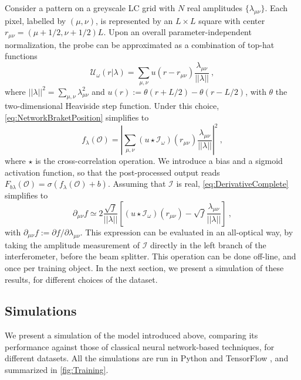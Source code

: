 \documentclass[reprint,
superscriptaddress,
nofootinbib,
aps,
pra,
showkeys
]{revtex4-2}
\newcommand{\I}{\mathcal{I}}
\newcommand{\U}{\mathcal{U}}
\newcommand{\f}{f}
\newcommand{\F}{F}
\renewcommand{\O}{\mathcal{O}}
\begin{document}
Consider a pattern on a greyscale LC grid with $N$ real amplitudes $\{\lambda_{\mu \nu}\}$. Each pixel, labelled by $(\mu,\nu)$, is represented by an $L \times L$ square with center $r_{\mu \nu} = (\mu + 1/2, \nu + 1/2)L$. Upon an overall parameter-independent normalization, the probe can be approximated as a combination of top-hat functions
\begin{equation}
	\U_{\omega}(r|\lambda) = \sum_{\mu,\nu} u(r-r_{\mu \nu})\frac{\lambda_{\mu \nu}}{||\lambda||} \ ,
	\label{eq:LCD}
\end{equation}
where $ ||\lambda||^2 = \sum_{\mu,\nu}\lambda_{\mu\nu}^2$ and $u(r) := \theta(r + L/2)-\theta(r - L/2)$, with $\theta$ the two-dimensional Heaviside step function. Under this choice, \cref{eq:NetworkBraketPosition} simplifies to
\begin{equation}
	\f_\lambda(\O) = \left| \sum_{\mu,\nu} (u \star  \I_{\omega})(r_{\mu\nu}) \frac{\lambda_{\mu \nu}}{||\lambda||} \right|^2 \ ,
	\label{eq:LCDLayerSpatial}
\end{equation}
where $\star$ is the cross-correlation operation. We introduce a bias and a sigmoid activation function, so that the post-processed output reads $\F_{b\lambda}(\O) = \sigma(\f_{\lambda}(\O) + b)$. Assuming that $\I$ is real, \cref{eq:DerivativeComplete} simplifies to
\begin{equation}
	\partial_{\mu \nu} \f \simeq 2 \frac{\sqrt{f}}{||\lambda||}\left[(u \star  \I_{\omega})(r_{\mu\nu}) - \sqrt{f} \frac{\lambda_{\mu \nu}}{||\lambda||} \right] \ ,
	\label{eq:LCDDerivativePosition}
\end{equation}
with $\partial_{\mu \nu}\f  := \partial f / \partial \lambda_{\mu \nu}$. This expression can be evaluated in an all-optical way, by taking the amplitude measurement of $\I$ directly in the left branch of the interferometer, before the beam splitter. This operation can be done off-line, and once per training object. In the next section, we present a simulation of these results, for different choices of the dataset.

\subsection{Simulations}
We present a simulation of the model introduced above, comparing its performance against those of classical neural network-based techniques, for different datasets. All the simulations are run in Python and TensorFlow \citep{soft:TensorFlow}, and summarized in \cref{fig:Training}.
\end{document}
